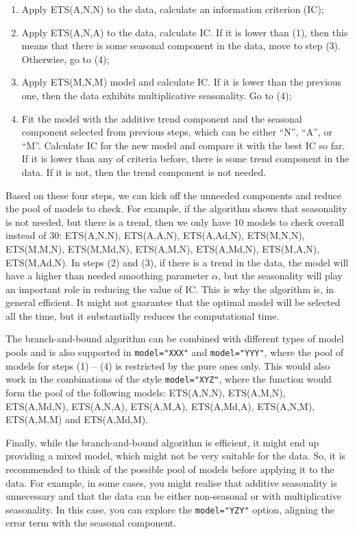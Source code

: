\documentclass[]{book}
\providecommand{\tightlist}{%
  \setlength{\itemsep}{0pt}\setlength{\parskip}{0pt}}
\theoremstyle{definition}
\theoremstyle{definition}
\theoremstyle{definition}
\theoremstyle{definition}
\theoremstyle{remark}
\begin{document}
\begin{enumerate}
\def\labelenumi{\arabic{enumi}.}
\tightlist
\item
  Apply ETS(A,N,N) to the data, calculate an information criterion (IC);
\item
  Apply ETS(A,N,A) to the data, calculate IC. If it is lower than (1), then this means that there is some seasonal component in the data, move to step (3). Otherwise, go to (4);
\item
  Apply ETS(M,N,M) model and calculate IC. If it is lower than the previous one, then the data exhibits multiplicative seasonality. Go to (4);
\item
  Fit the model with the additive trend component and the seasonal component selected from previous steps, which can be either ``N'', ``A'', or ``M''. Calculate IC for the new model and compare it with the best IC so far. If it is lower than any of criteria before, there is some trend component in the data. If it is not, then the trend component is not needed.
\end{enumerate}

Based on these four steps, we can kick off the unneeded components and reduce the pool of models to check. For example, if the algorithm shows that seasonality is not needed, but there is a trend, then we only have 10 models to check overall instead of 30: ETS(A,N,N), ETS(A,A,N), ETS(A,Ad,N), ETS(M,N,N), ETS(M,M,N), ETS(M,Md,N), ETS(A,M,N), ETS(A,Md,N), ETS(M,A,N), ETS(M,Ad,N). In steps (2) and (3), if there is a trend in the data, the model will have a higher than needed smoothing parameter \(\alpha\), but the seasonality will play an important role in reducing the value of IC. This is why the algorithm is, in general efficient. It might not guarantee that the optimal model will be selected all the time, but it substantially reduces the computational time.

The branch-and-bound algorithm can be combined with different types of model pools and is also supported in \texttt{model="XXX"} and \texttt{model="YYY"}, where the pool of models for steps (1) -- (4) is restricted by the pure ones only. This would also work in the combinations of the style \texttt{model="XYZ"}, where the function would form the pool of the following models: ETS(A,N,N), ETS(A,M,N), ETS(A,Md,N), ETS(A,N,A), ETS(A,M,A), ETS(A,Md,A), ETS(A,N,M), ETS(A,M,M) and ETS(A,Md,M).

Finally, while the branch-and-bound algorithm is efficient, it might end up providing a mixed model, which might not be very suitable for the data. So, it is recommended to think of the possible pool of models before applying it to the data. For example, in some cases, you might realise that additive seasonality is unnecessary and that the data can be either non-seasonal or with multiplicative seasonality. In this case, you can explore the \texttt{model="YZY"} option, aligning the error term with the seasonal component.
\end{document}
